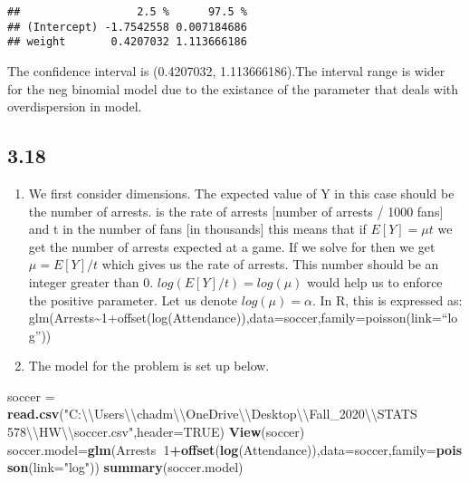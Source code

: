 \documentclass[
]{article}
\newenvironment{Shaded}{\begin{snugshade}}{\end{snugshade}}
\newcommand{\CharTok}[1]{\textcolor[rgb]{0.31,0.60,0.02}{#1}}
\newcommand{\DataTypeTok}[1]{\textcolor[rgb]{0.13,0.29,0.53}{#1}}
\newcommand{\DecValTok}[1]{\textcolor[rgb]{0.00,0.00,0.81}{#1}}
\newcommand{\KeywordTok}[1]{\textcolor[rgb]{0.13,0.29,0.53}{\textbf{#1}}}
\newcommand{\NormalTok}[1]{#1}
\newcommand{\OperatorTok}[1]{\textcolor[rgb]{0.81,0.36,0.00}{\textbf{#1}}}
\newcommand{\OtherTok}[1]{\textcolor[rgb]{0.56,0.35,0.01}{#1}}
\newcommand{\StringTok}[1]{\textcolor[rgb]{0.31,0.60,0.02}{#1}}
\begin{document}
\begin{verbatim}
##                  2.5 %      97.5 %
## (Intercept) -1.7542558 0.007184686
## weight       0.4207032 1.113666186
\end{verbatim}

The confidence interval is (0.4207032, 1.113666186).The interval range
is wider for the neg binomial model due to the existance of the
parameter that deals with overdispersion in model.

\hypertarget{section-5}{%
\subsection{3.18}\label{section-5}}

\begin{enumerate}
\def\labelenumi{\alph{enumi})}
\item
  We first consider dimensions. The expected value of Y in this case
  should be the number of arrests. \mu is the rate of arrests {[}number
  of arrests / 1000 fans{]} and t in the number of fans {[}in
  thousands{]} this means that if \(E[Y]=\mu t\) we get the number of
  arrests expected at a game. If we solve for \mu then we get
  \(\mu=E[Y]/t\) which gives us the rate of arrests. This number should
  be an integer greater than 0. \(log(E[Y]/t)=log(\mu)\) would help us
  to enforce the positive parameter. Let us denote \(log(\mu)=\alpha\).
  In R, this is expressed as:
  glm(Arrests\textasciitilde1+offset(log(Attendance)),data=soccer,family=poisson(link=``log''))
\item
  The model for the problem is set up below.
\end{enumerate}

\begin{Shaded}
\begin{Highlighting}[]
\NormalTok{soccer =}\StringTok{ }\KeywordTok{read.csv}\NormalTok{(}\StringTok{"C:}\CharTok{\textbackslash{}\textbackslash{}}\StringTok{Users}\CharTok{\textbackslash{}\textbackslash{}}\StringTok{chadm}\CharTok{\textbackslash{}\textbackslash{}}\StringTok{OneDrive}\CharTok{\textbackslash{}\textbackslash{}}\StringTok{Desktop}\CharTok{\textbackslash{}\textbackslash{}}\StringTok{Fall_2020}\CharTok{\textbackslash{}\textbackslash{}}\StringTok{STATS 578}\CharTok{\textbackslash{}\textbackslash{}}\StringTok{HW}\CharTok{\textbackslash{}\textbackslash{}}\StringTok{soccer.csv"}\NormalTok{,}\DataTypeTok{header=}\OtherTok{TRUE}\NormalTok{)}
\KeywordTok{View}\NormalTok{(soccer)}
\NormalTok{soccer.model=}\KeywordTok{glm}\NormalTok{(Arrests}\OperatorTok{~}\DecValTok{1}\OperatorTok{+}\KeywordTok{offset}\NormalTok{(}\KeywordTok{log}\NormalTok{(Attendance)),}\DataTypeTok{data=}\NormalTok{soccer,}\DataTypeTok{family=}\KeywordTok{poisson}\NormalTok{(}\DataTypeTok{link=}\StringTok{"log"}\NormalTok{))}
\KeywordTok{summary}\NormalTok{(soccer.model)}
\end{Highlighting}
\end{Shaded}
\end{document}

